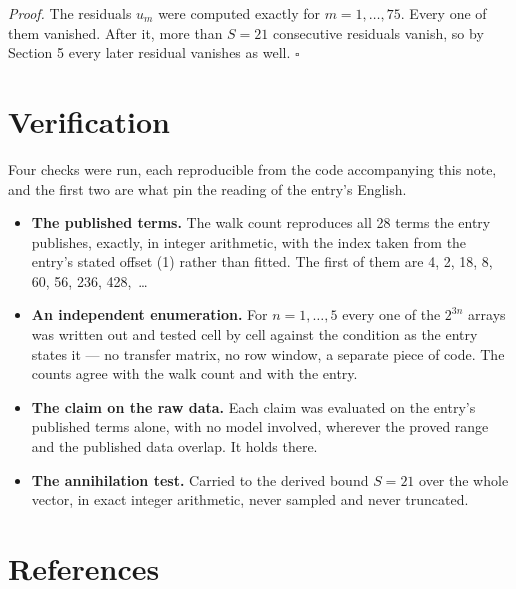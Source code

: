 \documentclass[11pt]{article}
\theoremstyle{definition}
\begin{document}
{\itshape Proof.} The residuals $u_m$ were computed exactly for $m = 1,\dots,75$. Every one of them vanished. After it, more than $S = 21$ consecutive residuals vanish, so by Section 5 every later residual vanishes as well. $\square$

\section{Verification}

Four checks were run, each reproducible from the code accompanying this note, and the first two are what pin the reading of the entry's English.

\begin{itemize}

\item {\bfseries The published terms.} The walk count reproduces all 28 terms the entry publishes, exactly, in integer arithmetic, with the index taken from the entry's stated offset (1) rather than fitted. The first of them are 4, 2, 18, 8, 60, 56, 236, 428,~\dots

\item {\bfseries An independent enumeration.} For $n = 1,\dots,5$ every one of the $2^{3n}$ arrays was written out and tested cell by cell against the condition as the entry states it --- no transfer matrix, no row window, a separate piece of code. The counts agree with the walk count and with the entry.

\item {\bfseries The claim on the raw data.} Each claim was evaluated on the entry's published terms alone, with no model involved, wherever the proved range and the published data overlap. It holds there.

\item {\bfseries The annihilation test.} Carried to the derived bound $S = 21$ over the whole vector, in exact integer arithmetic, never sampled and never truncated.

\end{itemize}

\section{References}
\end{document}
